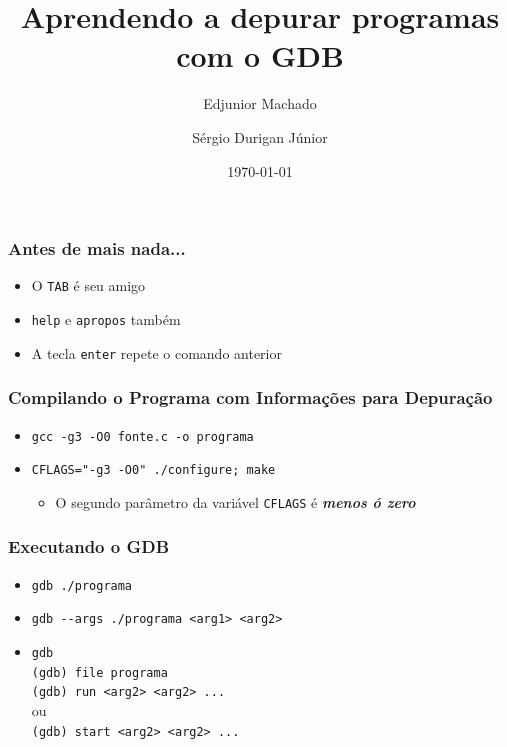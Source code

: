 \documentclass[xcolor=pdftex,dvipsnames,table,t]{beamer}
\title{Aprendendo a depurar programas com o GDB}
\author{Edjunior Machado \and
	Sérgio Durigan Júnior}
\date[Unicamp]{\today}
\begin{document}

\begin{frame}[fragile]
	\frametitle{Antes de mais nada...}
	\begin{itemize}
	  \item{O \verb|TAB| é seu amigo}
	  \item{\verb|help| e \verb|apropos| também}
	  \item{A tecla \verb|enter| repete o comando anterior}
	\end{itemize}
\end{frame}

\begin{frame}[fragile]
	\frametitle{Compilando o Programa com Informações para Depuração}
	  \begin{itemize}
	    \item{\verb|gcc -g3 -O0 fonte.c -o programa|}
	    \item{\verb|CFLAGS="-g3 -O0" ./configure; make|}
	      \begin{itemize}
		\item{O segundo parâmetro da variável \verb|CFLAGS| é \textbf{\textit{menos ó zero}}}
	      \end{itemize}
	  \end{itemize}
\end{frame}

\begin{frame}[fragile]
	\frametitle{Executando o GDB}
	  \begin{itemize}
	    \item{\verb|gdb ./programa|}
	    \item{\verb|gdb --args ./programa <arg1> <arg2>|}
	    \item{\verb|gdb| \\
		\verb|(gdb) file programa| \\
		\verb|(gdb) run <arg2> <arg2> ...|\\
		ou\\
		\verb|(gdb) start <arg2> <arg2> ...|}
	  \end{itemize}
\end{frame}
\end{document}

